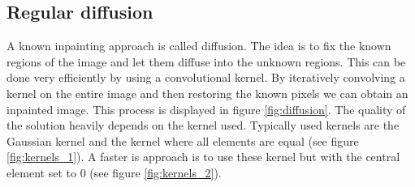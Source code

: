 \subsection{Regular diffusion}
A known inpainting approach is called diffusion. The idea is to fix the known regions of the image and let them diffuse into the unknown regions. This can be done very efficiently by using a convolutional kernel. By iteratively convolving a kernel on the entire image and then restoring the known pixels we can obtain an inpainted image. This process is displayed in figure \ref{fig:diffusion}. The quality of the solution heavily depends on the kernel used. Typically used kernels are the Gaussian kernel and the kernel where all elements are equal (see figure \ref{fig:kernels_1}). A faster is approach is to use these kernel but with the central element set to 0 \cite{richard2001fast} (see figure \ref{fig:kernels_2}).


